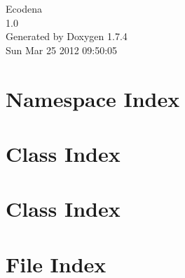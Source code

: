 \documentclass[a4paper]{book}
\begin{document}
\hypersetup{pageanchor=false}
\begin{titlepage}
\vspace*{7cm}
\begin{center}
{\Large Ecodena \\[1ex]\large 1.0 }\\
\vspace*{1cm}
{\large Generated by Doxygen 1.7.4}\\
\vspace*{0.5cm}
{\small Sun Mar 25 2012 09:50:05}\\
\end{center}
\end{titlepage}
\clearemptydoublepage
{}
\tableofcontents
\clearemptydoublepage
{}
\hypersetup{pageanchor=true}
\chapter{Namespace Index}

\chapter{Class Index}

\chapter{Class Index}

\chapter{File Index}

\end{document}
